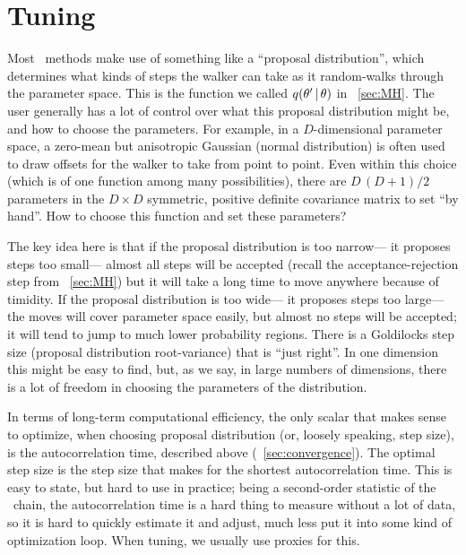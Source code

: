 \documentclass[modern]{aastex61}
\newcommand{\MCMC}{\acronym{MCMC}}
\newcommand{\pars}{\theta}
\begin{document}
\section{Tuning}\label{sec:tuning}
\nopagebreak
Most \MCMC\ methods make use of something like a ``proposal distribution'',
  which determines what kinds of steps the walker can take
  as it random-walks through the parameter space.
This is the function we called $q(\pars'\given\pars)$ in \sectionname~\ref{sec:MH}.
The user generally has a lot of control over what this proposal distribution might be,
  and how to choose the parameters.
For example, in a $D$-dimensional parameter space, %
  a zero-mean but anisotropic Gaussian (normal distribution)
  is often used to draw offsets for the walker to take from point to point.
Even within this choice (which is of one function among many possibilities),
  there are $D\,(D+1)/2$ parameters in the $D\times D$ symmetric, positive definite covariance matrix
  to set ``by hand''.
How to choose this function and set these parameters?

The key idea here is that if the proposal distribution is too narrow---%
  it proposes steps too small---%
  almost all steps will be accepted (recall the acceptance-rejection step from \sectionname~\ref{sec:MH})
  but it will take a long time to move anywhere because of timidity.
If the proposal distribution is too wide---%
  it proposes steps too large---%
  the moves will cover parameter space easily,
  but almost no steps will be accepted;
  it will tend to jump to much lower probability regions.
There is a Goldilocks step size (proposal distribution root-variance) that is ``just right''.
In one dimension this might be easy to find,
  but, as we say, in large numbers of dimensions,
  there is a lot of freedom in choosing the parameters of the distribution.

In terms of long-term computational efficiency,
  the only scalar that makes sense to optimize,
  when choosing proposal distribution (or, loosely speaking, step size),
  is the autocorrelation time, described above (\sectionname~\ref{sec:convergence}).
The optimal step size is the step size that makes for the shortest autocorrelation time.
This is easy to state, but hard to use in practice;
  being a second-order statistic of the \MCMC\ chain,
  the autocorrelation time is a hard thing to measure without a lot of data,
  so it is hard to quickly estimate it and adjust,
  much less put it into some kind of optimization loop.
When tuning, we usually use proxies for this.
\end{document}
